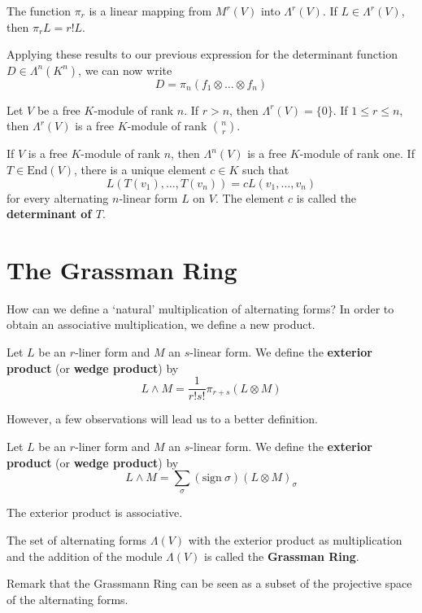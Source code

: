 \begin{lemma}
	The function $\pi_r$ is a linear mapping from $M^r(V)$ into $\Lambda^r(V)$. If $L \in \Lambda^r(V)$, then $\pi_r L = r! L$.
\end{lemma}

Applying these results to our previous expression for the determinant function $D \in \Lambda^n(K^n)$, we can now write
\[
	D = \pi_n (f_1 \otimes \ldots \otimes f_n)
\]

\begin{theorem}
	Let $V$ be a free $K$-module of rank $n$. If $r > n$, then $\Lambda^r(V) = \{ 0 \}$. If $1 \leq r \leq n$, then $\Lambda^r(V)$ is a free $K$-module of rank $\binom{n}{r}$.
\end{theorem}

\begin{corollary}
	If $V$ is a free $K$-module of rank $n$, then $\Lambda^n(V)$ is a free $K$-module of rank one. If $T \in \text{End}(V)$, there is a unique element $c \in K$ such that
	\[
		L(T(v_1), \ldots, T(v_n)) = cL(v_1, \ldots, v_n)
	\]
	for every alternating $n$-linear form $L$ on $V$. The element $c$ is called the \textbf{determinant of $T$}.
\end{corollary}

\section{The Grassman Ring}

How can we define a `natural' multiplication of alternating forms? In order to obtain an associative multiplication, we define a new product.

\begin{definition}
	Let $L$ be an $r$-liner form and $M$ an $s$-linear form. We define the \textbf{exterior product} (or \textbf{wedge product}) by
	\[
		L \wedge M = \frac{1}{r! s!} \pi_{r+s} (L \otimes M)
	\]
\end{definition}

However, a few observations will lead us to a better definition.

\begin{definition}
	Let $L$ be an $r$-liner form and $M$ an $s$-linear form. We define the \textbf{exterior product} (or \textbf{wedge product}) by
	\[
		L \wedge M = \sum_\sigma (\text{sign}~\sigma) (L \otimes M)_\sigma
	\]
\end{definition}

\begin{theorem}
	The exterior product is associative.
\end{theorem}

\begin{definition}
	The set of alternating forms $\Lambda(V)$ with the exterior product as multiplication and the addition of the module $\Lambda(V)$ is called the \textbf{Grassman Ring}.
\end{definition}

Remark that the Grassmann Ring can be seen as a subset of the projective space of the alternating forms.